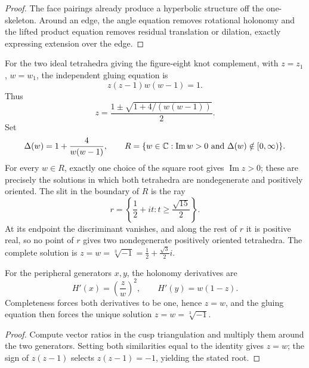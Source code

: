 \begin{proof}
\sketch The face pairings already produce a hyperbolic structure off the one-skeleton. Around an edge, the angle equation removes rotational holonomy and the lifted product equation removes residual translation or dilation, exactly expressing extension over the edge.
\end{proof}

\begin{proposition}
\label{thurston-ch04-figure-eight-shape-family}
For the two ideal tetrahedra giving the figure-eight knot complement, with \(z=z_1\), \(w=w_1\), the independent gluing equation is
\[
 z(z-1)w(w-1)=1.
\]
Thus
\[
 z=\frac{1\pm\sqrt{1+4/(w(w-1))}}2.
\]
Set
\[
 \Delta(w)=1+\frac{4}{w(w-1)},\qquad
 R=\{w\in\mathbb{C}:\operatorname{Im}w>0\text{ and }\Delta(w)\notin[0,\infty)\}.
\]
For every \(w\in R\), exactly one choice of the square root gives \(\operatorname{Im}z>0\); these are precisely the solutions in which both tetrahedra are nondegenerate and positively oriented.  The slit in the boundary of \(R\) is the ray
\[
 r=\left\{\frac12+it:t\geq\frac{\sqrt{15}}2\right\}.
\]
At its endpoint the discriminant vanishes, and along the rest of \(r\) it is positive real, so no point of \(r\) gives two nondegenerate positively oriented tetrahedra.  The complete solution is \(z=w=\sqrt[3]{-1}=\frac12+\frac{\sqrt3}{2}i\).

\end{proposition}

\begin{proposition}
\label{thurston-ch04-figure-eight-completeness}
For the peripheral generators \(x,y\), the holonomy derivatives are
\[
 H'(x)=\left(\frac zw\right)^2,\qquad H'(y)=w(1-z).
\]
Completeness forces both derivatives to be one, hence \(z=w\), and the gluing equation then forces the unique solution \(z=w=\sqrt[3]{-1}\).

\end{proposition}

\begin{proof}
\sketch Compute vector ratios in the cusp triangulation and multiply them around the two generators. Setting both similarities equal to the identity gives \(z=w\); the sign of \(z(z-1)\) selects \(z(z-1)=-1\), yielding the stated root.
\end{proof}

